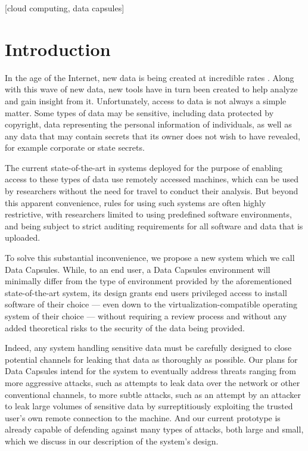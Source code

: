 \documentclass{acm_proc_article-sp}
\begin{document}
[cloud computing, data capsules]


\section{Introduction}

In the age of the Internet, new data is being created at incredible rates
\cite{digital-universe}.  Along with this wave of new data, new tools have in
turn been created to help analyze and gain insight from it. Unfortunately,
access to data is not always a simple matter.  Some types of data may be
sensitive, including data protected by copyright, data representing the
personal information of individuals, as well as any data that may contain
secrets that its owner does not wish to have revealed, for example corporate or
state secrets.

The current state-of-the-art \cite{vrdc} in systems deployed for the purpose
of enabling access to these types of data use remotely accessed machines, which
can be used by researchers without the need for travel to conduct their
analysis. But beyond this apparent convenience, rules for using such systems
are often highly restrictive, with researchers limited to using predefined
software environments, and being subject to strict auditing requirements for
all software and data that is uploaded.  

To solve this substantial inconvenience, we propose a new system which we call
Data Capsules.  While, to an end user, a Data Capsules environment will
minimally differ from the type of environment provided by the aforementioned
state-of-the-art system, its design grants end users privileged access to
install software of their choice --- even down to the virtualization-compatible
operating system of their choice --- without requiring a review process and
without any added theoretical risks to the security of the data being provided.

Indeed, any system handling sensitive data must be carefully designed to close
potential channels for leaking that data as thoroughly as possible.  Our plans
for Data Capsules intend for the system to eventually address threats ranging
from more aggressive attacks, such as attempts to leak data over the network or
other conventional channels, to more subtle attacks, such as an attempt by an
attacker to leak large volumes of sensitive data by surreptitiously exploiting
the trusted user's own remote connection to the machine.  And our current
prototype is already capable of defending against many types of attacks, both
large and small, which we discuss in our description of the system's design.
\end{document}
